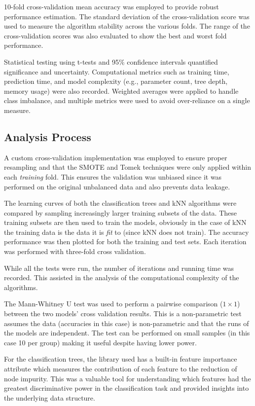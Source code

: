 \documentclass[10pt, conference]{IEEEtran}
\begin{document}
10-fold cross-validation mean accuracy was employed to provide robust performance estimation. The standard deviation of the cross-validation score was used to measure the algorithm stability across the various folds. The range of the cross-validation scores was also evaluated to show the best and worst fold performance. 

Statistical testing using t-tests and 95\% confidence intervals quantified significance and uncertainty. Computational metrics such as training time, prediction time, and model complexity (e.g., parameter count, tree depth, memory usage) were also recorded. Weighted averages were applied to handle class imbalance, and multiple metrics were used to avoid over-reliance on a single measure.

\subsection{Analysis Process}

A custom cross-validation implementation was employed to ensure proper resampling and that the SMOTE and Tomek techniques were only applied within each \textit{training} fold. This ensures the validation was unbiased since it was performed on the original unbalanced data and also prevents data leakage.

The learning curves of both the classification trees and kNN algorithms were compared by sampling increasingly larger training subsets of the data. These training subsets are then used to train the models, obviously in the case of kNN the training data is the data it is \textit{fit} to (since kNN does not train). The accuracy performance was then plotted for both the training and test sets. Each iteration was performed with three-fold cross validation.

While all the tests were run, the number of iterations and running time was recorded. This assisted in the analysis of the computational complexity of the algorithms.

The Mann-Whitney U test \cite{mann1947test} was used to perform a pairwise comparison ($1 \times 1$) between the two models' cross validation results.  This is a non-parametric test assumes the data (accuracies in this case) is non-parametric and that the runs of the models are independent. The test can be performed on small samples (in this case 10 per group) making it useful despite having lower power.

For the classification trees, the library used has a built-in feature importance attribute which measures the contribution of each feature to the reduction of node impurity. This was a valuable tool for understanding which features had the greatest discriminative power in the classification task and provided insights into the underlying data structure.
\end{document}
